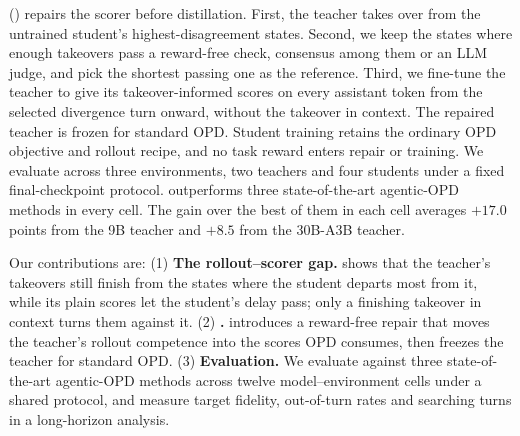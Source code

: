 \methodlong{} (\method{}) repairs the scorer before distillation. First, the teacher takes over from the untrained student's highest-disagreement states. Second, we keep the states where enough takeovers pass a reward-free check, consensus among them or an LLM judge, and pick the shortest passing one as the reference. Third, we fine-tune the teacher to give its takeover-informed scores on every assistant token from the selected divergence turn onward, without the takeover in context. The repaired teacher is frozen for standard OPD. Student training retains the ordinary OPD objective and rollout recipe, and no task reward enters repair or training. We evaluate \method{} across three environments, two teachers and four students under a fixed final-checkpoint protocol. \method{} outperforms three state-of-the-art agentic-OPD methods in every cell. The gain over the best of them in each cell averages $+17.0$ points from the 9B teacher and $+8.5$ from the 30B-A3B teacher.

Our contributions are:
(1) \textbf{The rollout--scorer gap.}  shows that the teacher's takeovers still finish from the states where the student departs most from it, while its plain scores let the student's delay pass; only a finishing takeover in context turns them against it.
(2) \textbf{\method{}.}  introduces a reward-free repair that moves the teacher's rollout competence into the scores OPD consumes, then freezes the teacher for standard OPD.
(3) \textbf{Evaluation.} We evaluate \method{} against three state-of-the-art agentic-OPD methods across twelve model--environment cells under a shared protocol, and measure target fidelity, out-of-turn rates and searching turns in a long-horizon analysis.
